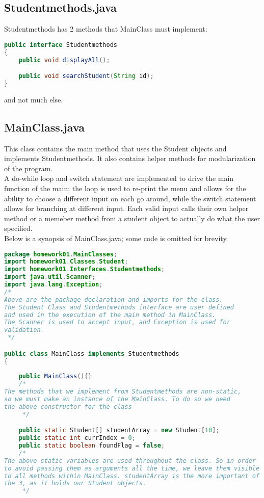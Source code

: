 \documentclass{article}
\begin{document}
\begin{large}
\subsection*{Studentmethods.java}
Studentmethods has 2 methods that MainClass must implement:
\begin{lstlisting}[language=Java]
public interface Studentmethods
{
	public void displayAll();

	public void searchStudent(String id);
}
\end{lstlisting}
and not much else.
\subsection*{MainClass.java}	
This class contains the main method that uses the Student objects and implements Studentmethods. It also contains helper methods for modularization of the program.\\
A do-while loop and switch statement are implemented to drive the main function of the main; the loop is used to re-print the menu and allows for the ability to choose a different input on each go around, while the switch statement allows for branching at different input. Each valid input calls their own helper method or a memeber method from a student object to actually do what the user specified.\\
Below is a synopsis of MainClass.java; some code is omitted for brevity.
\begin{lstlisting}[language=Java]
package homework01.MainClasses;
import homework01.Classes.Student;
import homework01.Interfaces.Studentmethods;
import java.util.Scanner;
import java.lang.Exception;
/* 
Above are the package declaration and imports for the class.
The Student Class and Studentmethods interface are user defined
and used in the execution of the main method in MainClass.
The Scanner is used to accept input, and Exception is used for 
validation.
 */

public class MainClass implements Studentmethods
{
	
	public MainClass(){}
	/*
The methods that we implement from Studentmethods are non-static,
so we must make an instance of the MainClass. To do so we need
the above constructor for the class
	 */

	public static Student[] studentArray = new Student[10];
	public static int currIndex = 0;
	public static boolean foundFlag = false;
	/*
The above static variables are used throughout the class. So in order
to avoid passing them as arguments all the time, we leave them visible 
to all methods within MainClass. studentArray is the more important of
the 3, as it holds our Student objects. 
	 */


\end{lstlisting}
\end{large}
\end{document}
